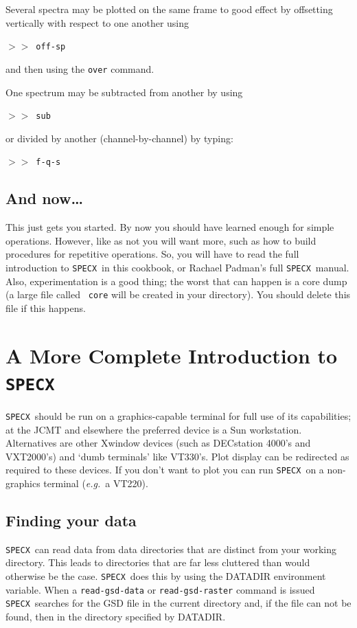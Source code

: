 \documentclass[11pt,twoside]{article}
\newcommand{\xlabel}[1]{}
\newcommand{\eg}{{\it e.g.}}
\newcommand{\SPECX}{{\tt SPECX}}
\newcommand{\SP}{{$>\!>$}}
\begin{document}
Several spectra may be plotted on the same frame to good effect by
offsetting vertically with respect to one another using

\SP\ {\tt off-sp}

and then using the {\tt over} command.

One spectrum may be subtracted from another by using

\SP\ {\tt sub}

or divided by another (channel-by-channel) by typing:

\SP\ {\tt f-q-s}

\subsection{And now\ldots}
This just gets you started. By now you should have learned enough for
simple operations. However, like as not you will want more, such as how
to build procedures for repetitive operations. So, you will have to
read the full introduction to \SPECX\ in this cookbook, or Rachael
Padman's full \SPECX\ manual. Also, experimentation is a good thing;
the worst that can happen is a core dump (a large file called {\tt
core} will be created in your directory). You should delete this file 
if this happens.


\section{\xlabel{a_more_complex_introdcution_to_specx}%
A More Complete Introduction to \SPECX }
\label{sec:specx-intro}

\SPECX\ should be run on a graphics-capable terminal for full use of its 
capabilities; at the JCMT and elsewhere the preferred device is a Sun
workstation. Alternatives are other Xwindow devices (such as DECstation
4000's and VXT2000's) and `dumb terminals' like VT330's. Plot display
can be redirected as required to these devices. If you don't want to
plot you can run \SPECX\ on a non-graphics terminal (\eg\ a VT220).


\subsection{Finding your data}
\label{sec:finding-the-data}

\SPECX\ can read data from data directories that are distinct from your
working directory. This leads to directories that are far less cluttered than
would otherwise be the case. \SPECX\ does this by using the DATADIR 
environment variable. When a {\tt read-gsd-data} or {\tt read-gsd-raster}
command is issued \SPECX\ searches for the GSD file in the current directory
and, if the file can not be found, then in the directory specified by 
DATADIR.
\end{document}
